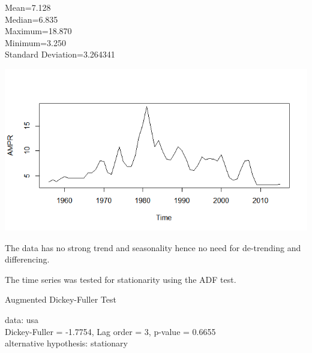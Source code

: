 \documentclass[12pt, a4paper]{report}\usepackage[]{graphicx}\usepackage[]{color}
\begin{document}
Mean=7.128 \\
Median=6.835\\
Maximum=18.870\\
Minimum=3.250\\
Standard Deviation=3.264341\\

\begin{center}
\includegraphics{rplot03}
\end{center}
The data has no strong trend and seasonality hence no need for de-trending and differencing.

The time series was tested for stationarity using the ADF test.


Augmented Dickey-Fuller Test

data:  usa\\

Dickey-Fuller = -1.7754, Lag order = 3, p-value = 0.6655\\

alternative hypothesis: stationary\\
\end{document}
